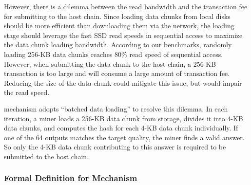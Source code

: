 However, there is a dilemma between the read bandwidth and the transaction fee for submitting {\sproof} to the host chain.
%
Since loading data chunks from local disks should be more efficient than downloading them via the network,
%
the loading stage should leverage the fast SSD read speeds in sequential access to maximize the data chunk loading bandwidth.
%
According to our benchmarks, randomly loading 256-KB data chunks reaches 80\% read speed of sequential access. 
%
However, when submitting the data chunk to the host chain, a 256-KB transaction is too large and will consume a large amount of transaction fee.
%
Reducing the size of the data chunk could mitigate this issue, but would impair the read speed. 

{\sproof} mechanism adopts ``batched data loading'' to resolve this dilemma. 
%
In each iteration, a miner loads a 256-KB data chunk from storage, divides it into 4-KB data chunks, and computes the hash for each 4-KB data chunk individually. 
%
If one of the 64 outputs matches the target quality, the miner finds a valid answer.
%
So only the 4-KB data chunk contributing to this answer is required to be submitted to the host chain. 

\subsubsection{Formal Definition for \sproof Mechanism}

